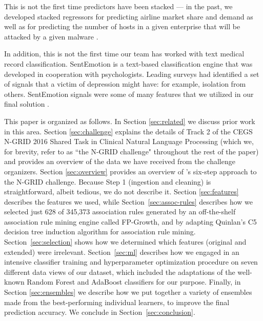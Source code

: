 This is not the first time predictors have been stacked --- in the past, we developed stacked regressors for predicting airline market share and demand \cite{an2016map} as well as for predicting the number of hosts in a given enterprise that will be attacked by a given malware
\cite{kang2016ensemble}.

In addition, this is not the first time our team has worked with text medical record classification. SentEmotion is a text-based classification engine that was developed in cooperation with psychologists. Leading surveys had identified a set of signals that a victim of depression might have: for example, isolation from others. SentEmotion signals were some of many features that we utilized in our final solution \cite{coptads}.

This paper is organized as follows. In Section \ref{sec:related} we discuss prior work in this area.  Section
\ref{sec:challenge} explains the details of Track 2 of the CEGS N-GRID 2016 Shared Task in Clinical Natural Language Processing (which we, for brevity, refer to as ``the N-GRID challenge"
throughout the rest of the paper) and provides an
overview of the data we have received from the challenge organizers.  
Section \ref{sec:overview} provides an overview of \CREATE's six-step
approach to the N-GRID challenge.  Because Step 1 (ingestion and cleaning) is 
straightforward, albeit tedious, we do not describe it.
Section \ref{sec:features} describes the features we used, while
Section~\ref{sec:assoc-rules} describes how we selected just 628 of 345,373 association rules  generated by an off-the-shelf association rule mining engine
called FP-Growth\cite{fpgrowth}, and by adapting Quinlan's C5 decision tree
induction algorithm \cite{c45,c5} for association rule mining. 
Section~\ref{sec:selection} shows how we determined 
which features (original and extended) were irrelevant.
Section~\ref{sec:ml} describes how  we engaged in an intensive classifier training and
hyperparameter optimization procedure on seven different data views of our dataset, 
which included the  adaptations of the well-known Random Forest and AdaBoost classifiers
for our purpose.  Finally, in Section \ref{sec:ensembles} we describe how we put together 
a variety of ensembles made from the best-performing individual learners, to 
improve the final prediction accuracy.
We conclude in Section~\ref{sec:conclusion}.
